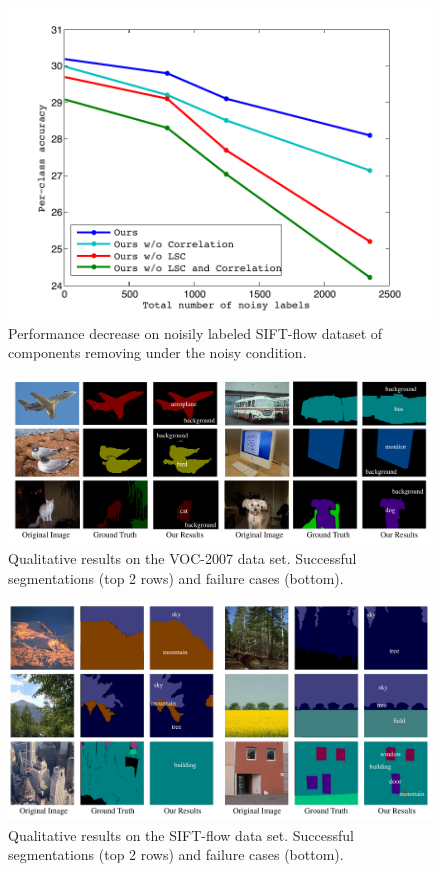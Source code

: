 \begin{figure}[htb]
\begin{center}
    \includegraphics[width=1\linewidth]{fig_noisylabel.pdf}
\end{center}
\vspace{-3mm}
\caption{Performance decrease on noisily labeled SIFT-flow dataset of components removing under the noisy condition.}
\label{fig:noisyexp}
\end{figure}


\begin{figure}
\begin{center}
    \includegraphics[width=0.9\linewidth]{Fig_VOC.pdf}
\end{center}
\vspace{-3mm}
\caption{Qualitative results on the VOC-2007 data set. Successful segmentations (top 2 rows) and failure cases (bottom).}
\label{fig:VOC-2007}
\end{figure}

\begin{figure}
\begin{center}
    \includegraphics[width=0.9\linewidth]{Fig_SIFTflow.pdf}
\end{center}
\vspace{-3mm}
\caption{Qualitative results on the SIFT-flow data set. Successful segmentations (top 2 rows) and failure cases (bottom).}
\label{fig:SIFT-flow}
\end{figure}


